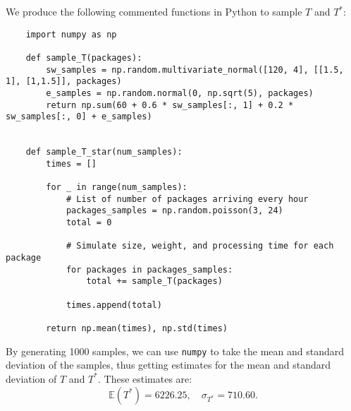 \documentclass[expanded]{lkx_pset}
\begin{document}
\begin{parts}
  We produce the following commented functions in Python to sample $T$ and $T^*$:
  \begin{verbatim}
    import numpy as np

    def sample_T(packages):
        sw_samples = np.random.multivariate_normal([120, 4], [[1.5, 1], [1,1.5]], packages)
        e_samples = np.random.normal(0, np.sqrt(5), packages)
        return np.sum(60 + 0.6 * sw_samples[:, 1] + 0.2 * sw_samples[:, 0] + e_samples)


    def sample_T_star(num_samples):
        times = []

        for _ in range(num_samples):
            # List of number of packages arriving every hour
            packages_samples = np.random.poisson(3, 24)
            total = 0

            # Simulate size, weight, and processing time for each package
            for packages in packages_samples:
                total += sample_T(packages)

            times.append(total)

        return np.mean(times), np.std(times)
  \end{verbatim}

  By generating 1000 samples, we can use \texttt{numpy} to take the mean and standard deviation of the samples, thus getting estimates for the mean and standard deviation of $T$ and $T^*$. These estimates are:
  \[\mathbb{E}(T^*) = 6226.25, \quad \sigma_{T^*} = 710.60. \]
\end{parts}
\end{document}
